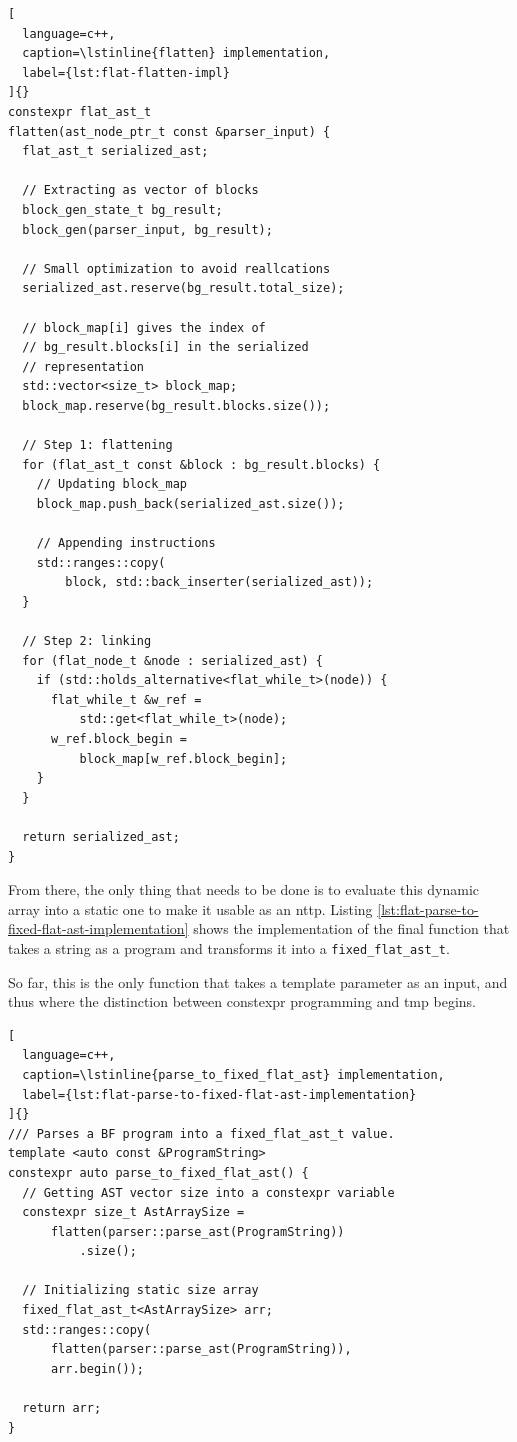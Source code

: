 \documentclass[../main]{subfiles}
\begin{document}
\begin{lstlisting}[
  language=c++,
  caption=\lstinline{flatten} implementation,
  label={lst:flat-flatten-impl}
]{}
constexpr flat_ast_t
flatten(ast_node_ptr_t const &parser_input) {
  flat_ast_t serialized_ast;

  // Extracting as vector of blocks
  block_gen_state_t bg_result;
  block_gen(parser_input, bg_result);

  // Small optimization to avoid reallcations
  serialized_ast.reserve(bg_result.total_size);

  // block_map[i] gives the index of
  // bg_result.blocks[i] in the serialized
  // representation
  std::vector<size_t> block_map;
  block_map.reserve(bg_result.blocks.size());

  // Step 1: flattening
  for (flat_ast_t const &block : bg_result.blocks) {
    // Updating block_map
    block_map.push_back(serialized_ast.size());

    // Appending instructions
    std::ranges::copy(
        block, std::back_inserter(serialized_ast));
  }

  // Step 2: linking
  for (flat_node_t &node : serialized_ast) {
    if (std::holds_alternative<flat_while_t>(node)) {
      flat_while_t &w_ref =
          std::get<flat_while_t>(node);
      w_ref.block_begin =
          block_map[w_ref.block_begin];
    }
  }

  return serialized_ast;
}
\end{lstlisting}


From there, the only thing that needs to be done is to evaluate this
dynamic array into a static one to make it usable as an \gls{nttp}.
Listing \ref{lst:flat-parse-to-fixed-flat-ast-implementation} shows the
implementation of the final function that takes a string as a program
and transforms it into a \lstinline{fixed_flat_ast_t}.

So far, this is the only function that takes a template parameter as an input,
and thus where the distinction between \gls{constexpr} programming and \gls{tmp}
begins.

\clearpage%

\begin{lstlisting}[
  language=c++,
  caption=\lstinline{parse_to_fixed_flat_ast} implementation,
  label={lst:flat-parse-to-fixed-flat-ast-implementation}
]{}
/// Parses a BF program into a fixed_flat_ast_t value.
template <auto const &ProgramString>
constexpr auto parse_to_fixed_flat_ast() {
  // Getting AST vector size into a constexpr variable
  constexpr size_t AstArraySize =
      flatten(parser::parse_ast(ProgramString))
          .size();

  // Initializing static size array
  fixed_flat_ast_t<AstArraySize> arr;
  std::ranges::copy(
      flatten(parser::parse_ast(ProgramString)),
      arr.begin());

  return arr;
}
\end{lstlisting}
\end{document}
